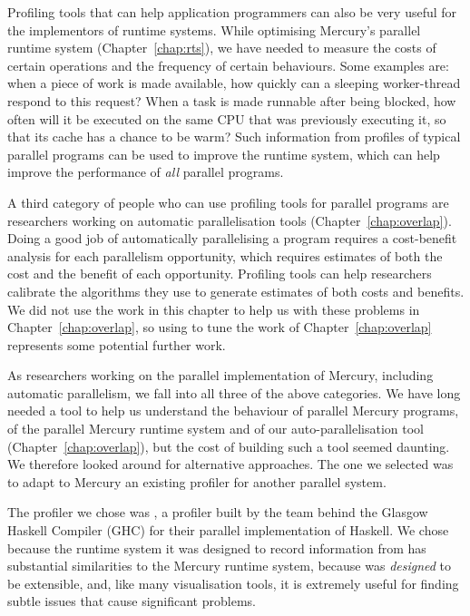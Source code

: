 Profiling tools that can help application programmers
can also be very useful for the implementors of runtime systems.
While optimising Mercury's parallel runtime system (Chapter~\ref{chap:rts}),
we have needed to measure the costs of certain operations
and the frequency of certain behaviours.
Some examples are:
when a piece of work is made available,
how quickly can a sleeping worker-thread respond to this request?
When a task is made runnable after being blocked,
how often will it be executed on the same CPU that was previously executing it,
so that its cache has a chance to be warm?
Such information from profiles of typical parallel programs
can be used to improve the runtime system,
which can help improve the performance of \emph{all} parallel programs.

A third category of people who can use profiling tools for parallel programs
are researchers working on automatic parallelisation tools
(Chapter~\ref{chap:overlap}).
Doing a good job of automatically parallelising a program
requires a cost-benefit analysis for each parallelism opportunity,
which requires estimates of both the cost and the benefit of each opportunity.
Profiling tools can help researchers calibrate
the algorithms they use to generate estimates of both costs and benefits.
We did not use the work in this chapter to help us with these problems in
Chapter~\ref{chap:overlap},
so using \tscope to tune the work of Chapter~\ref{chap:overlap} represents
some potential further work.

As researchers working on the parallel implementation of Mercury,
including automatic parallelism,
we fall into all three of the above categories.
We have long needed a tool
to help us understand the behaviour of parallel Mercury programs,
of the parallel Mercury runtime system
and of our auto-parallelisation tool (Chapter~\ref{chap:overlap}),
but the cost of building such a tool seemed daunting.
We therefore looked around for alternative approaches.
The one we selected was to adapt to Mercury
an existing profiler for another parallel system.

The profiler we chose was \tscope \citep{threadscope},
a profiler built by the team behind the Glasgow Haskell Compiler (GHC)
for their parallel implementation of Haskell.
We chose \tscope because
the runtime system it was designed to record information from
has substantial similarities to the Mercury runtime system,
because \tscope was \emph{designed} to be extensible,
and, like many visualisation tools, it is extremely useful
for finding subtle issues that cause significant problems.

